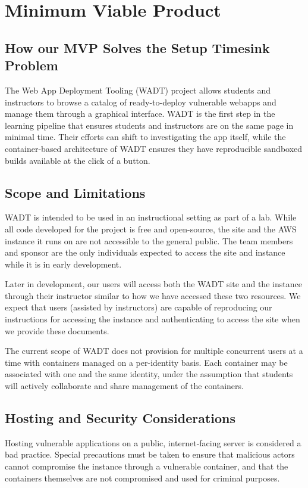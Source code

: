 \documentclass[12pt]{article}
\begin{document}
\section{Minimum Viable Product}

\subsection{How our MVP Solves the Setup Timesink Problem}
The Web App Deployment Tooling (WADT) project allows students and instructors to browse a catalog of ready-to-deploy vulnerable webapps and manage them through a graphical interface. WADT is the first step in the learning pipeline that ensures students and instructors are on the same page in minimal time. Their efforts can shift to investigating the app itself, while the container-based architecture of WADT ensures they have reproducible sandboxed builds available at the click of a button.

\subsection{Scope and Limitations}
WADT is intended to be used in an instructional setting as part of a lab. While all code developed for the project is free and open-source, the site and the AWS instance it runs on are not accessible to the general public. The team members and sponsor are the only individuals expected to access the site and instance while it is in early development.

Later in development, our users will access both the WADT site and the instance through their instructor similar to how we have accessed these two resources. We expect that users (assisted by instructors) are capable of reproducing our instructions for accessing the instance and authenticating to access the site when we provide these documents.

The current scope of WADT does not provision for multiple concurrent users at a time with containers managed on a per-identity basis. Each container may be associated with one and the same identity, under the assumption that students will actively collaborate and share management of the containers.

\subsection{Hosting and Security Considerations}
Hosting vulnerable applications on a public, internet-facing server is considered a bad practice. Special precautions must be taken to ensure that malicious actors cannot compromise the instance through a vulnerable container, and that the containers themselves are not compromised and used for criminal purposes.
\end{document}
